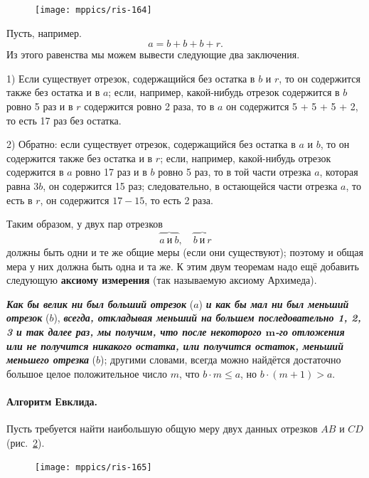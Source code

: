 \documentclass[oneside]{book}
\makeatletter
\newcommand{\rindex}[2][\imki@jobname]{%
  \index[#1]{\detokenize{#2}}%
}
\makeatother
\begin{document}
\begin{figure}
\centering
\texttt{[image: mppics/ris-164]}
\caption{}\label{1938/ris-164}
\end{figure}

Пусть, например.
\[a=b+b+b+r.\]
Из этого равенства мы можем вывести следующие два заключения.

1) Если существует отрезок, содержащийся без остатка в $b$ и $r$, то он содержится также без остатка и в $a$;
если, например, какой-нибудь отрезок содержится в $b$ ровно 5 раз и в $r$ содержится ровно 2 раза, то в $a$ он содержится 5 + 5 + 5 + 2, то есть 17 раз без остатка.

2) Обратно:
если существует отрезок, содержащийся без остатка в $a$ и $b$, то он содержится также без остатка и в $r$;
если, например, какой-нибудь отрезок содержится в $a$ ровно 17 раз и в $b$ ровно 5 раз, то в той части отрезка $a$, которая равна $3b$, он содержится 15 раз;
следовательно, в остающейся части отрезка $a$, то есть в $r$, он содержится $17-15$, то есть 2 раза.

Таким образом, у двух пар отрезков
\[\overbrace{a\ \text{и}\ b},\quad \overbrace{b\ \text{и}\ r}\]
должны быть одни и те же общие меры (если они существуют);
поэтому и  общая мера у них должна быть одна и та же.
К этим двум теоремам надо ещё добавить следующую \rindex{аксиома измерения}\textbf{аксиому измерения} (так называемую \rindex{аксиома Архимеда}аксиому Архимеда). 

\textbf{\emph{Как бы велик ни был больший отрезок}} ($a$) \textbf{\emph{и как бы мал ни был меньший отрезок}} ($b$), \textbf{\emph{всегда, откладывая меньший на большем последовательно 1, 2, 3 и так далее раз, мы получим, что после некоторого $\bm{m}$-го отложения или не получится никакого остатка, или получится остаток, меньший меньшего отрезка}} ($b$);
другими словами, всегда можно найдётся достаточно большое целое положительное число $m$, что $b \cdot  m \le a$, но $b \cdot  (m + 1) > a$. 

\paragraph{Алгоритм Евклида.}\label{1938/147}
Пусть требуется найти наибольшую общую меру двух данных отрезков $AB$ и $CD$ (рис.~\ref{1938/ris-165}).

\begin{figure}
\centering
\texttt{[image: mppics/ris-165]}
\caption{}\label{1938/ris-165}
\end{figure}
\end{document}

